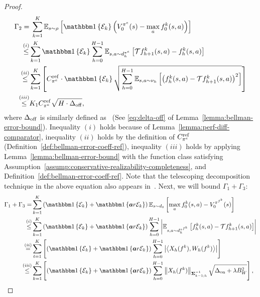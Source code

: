 \begin{proof}
\begin{equation}
    \label{eq:derivation_gamma2}
    \begin{split}
        \Gamma_2 = &\;\sum_{k=1}^K\bb E_{s\sim\rho}\brac{\indicator{{\mc E}_k}\paren{V_0^{\pi^e}(s)-\max_a f_0^k(s,a)}}\\
        \overset{(i)}{\leq} & \sum_{k=1}^K\indicator{\mc E_k}\sum_{h=0}^{H-1}\bb E_{s,a\sim d_h^{\pi^e}}\brac{\mc T f_{h+1}^k(s,a)-f_h^k(s,a)}\\
        \overset{(ii)}{\leq} & \sum_{k=1}^K \brac{C_{\pi^e}^\mr{ref}\cdot\indicator{\mc E_k}\sqrt{\sum_{h=0}^{H-1}\bb E_{s,a\sim\nu_h}\brac{\paren{f_h^k(s,a)-\mc T f_{h+1}^k(s,a)}^2}}} \\
        \overset{(iii)}{\leq} & K_1C_{\pi^e}^\mr{ref}\sqrt{H\cdot \Deltaoff},
    \end{split}
\end{equation}
where $\Delta_\mathrm{off}$ is similarly defined as~\citet{song2023hybrid} (See \eqref{eq:delta-off} of Lemma~\ref{lemma:bellman-error-bound}). Inequality $(i)$ holds because of Lemma~\ref{lemma:perf-diff-comparator}, inequality $(ii)$ holds by the definition of $C_{\pi^e}^\mathrm{ref}$ (Definition~\ref{def:bellman-error-coeff-ref}), inequality $(iii)$ holds by applying Lemma~\ref{lemma:bellman-error-bound} with the function class satisfying Assumption~\ref{assump:conservative-realizability-completeness}, and Definition~\ref{def:bellman-error-coeff-ref}. Note that the telescoping decomposition technique in the above equation also appears in~\citep{xie2020q,jin2021bellman,du2021bilinear}. Next, we will bound $\Gamma_1+\Gamma_3$:
\begin{equation}
    \begin{split}
        \Gamma_1+\Gamma_3  =& \sum_{k=1}^K\paren{\indicator{\mc E_k}+\indicator{\mathbf{a}r{\mc E}_k}}\bb E_{s\sim d_0}\brac{\max_a f_0^k(s,a)-V_0^{\pi^{f^k}}(s)}\\
        \overset{(i)}{\leq}& \sum_{k=1}^K\paren{\indicator{\mc E_k}+\indicator{\mathbf{a}r{\mc E}_k}}\sum_{h=0}^{H-1}\abs{\bb E_{s,a\sim d_h^{\pi^{f^k}}}\brac{f_h^k(s,a)-\mc T f_{h+1}^k(s,a)}}\\
        \overset{(ii)}{=}&\sum_{t=1}^K\brac{\paren{\indicator{\mc E_k}+\indicator{\mathbf{a}r{\mc E}_k}}\sum_{h=0}^{H-1}\abs{\innerprod{X_h(f^k)}{W_h(f^k)}}}\\
        \overset{(iii)}{\leq}&\sum_{k=1}^K\brac{\paren{\indicator{\mc E_k}+\indicator{\mathbf{a}r{\mc E}_k}}\sum_{h=0}^{H-1}\norm{X_h(f^k)}{\mb \Sigma^{-1}_{k-1;h}}\sqrt{\Deltaon+\lambda B_W^2}},
    \end{split}

\end{equation}
\end{proof}
